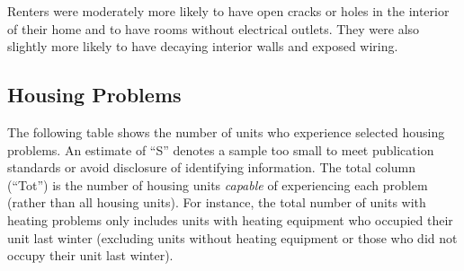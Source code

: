 \documentclass[
]{book}
\begin{document}
Renters were moderately more likely to have open cracks or holes in the interior of their home and to have rooms without electrical outlets. They were also slightly more likely to have decaying interior walls and exposed wiring.

\hypertarget{housing-problems}{%
\subsection{Housing Problems}\label{housing-problems}}

The following table shows the number of units who experience selected housing problems. An estimate of ``S'' denotes a sample too small to meet publication standards or avoid disclosure of identifying information. The total column (``Tot'') is the number of housing units \emph{capable} of experiencing each problem (rather than all housing units). For instance, the total number of units with heating problems only includes units with heating equipment who occupied their unit last winter (excluding units without heating equipment or those who did not occupy their unit last winter).
\end{document}
